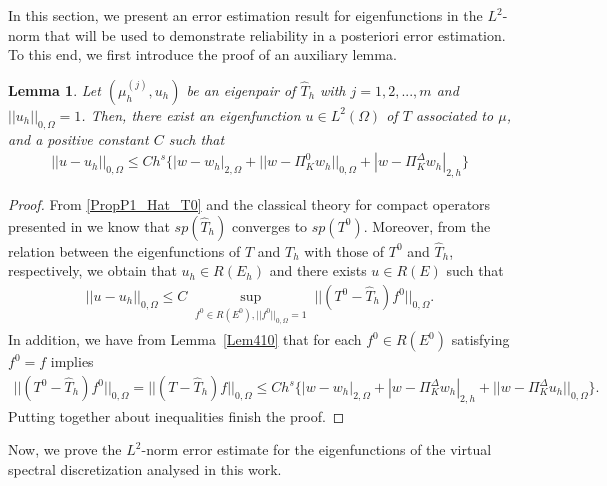 \documentclass[final,reqno]{elsarticle}
\newtheorem{lemma}{Lemma}[section]
\def\LO{L^2(\O)}
\def\O{\Omega}
\def\PiK{\Pi_{K}^{\Delta}}
\def\LO{L^2(\Omega)}
\begin{document}
In this section, we present an error estimation result for eigenfunctions in the $L^2$-norm that will be used to demonstrate reliability in a posteriori error estimation. To this end, we first introduce the proof of an auxiliary lemma.
\begin{lemma}\label{Lema4.12} Let $(\mu_h^{(j)},u_h)$ be an eigenpair of $\widehat{T}_h$  with $j=1,2,...,m$ and $||u_h ||_{0,\O}=1$. Then, there exist an eigenfunction $u\in \LO$ of $T$ associated to $\mu$, and a positive constant $C$ such that
\begin{align}
||u-u_h ||_{0,\O}\leq  Ch^s\Big\{|w-w_h|_{2,\O}+||w-\Pi_K^0 w_h ||_{0,\Omega}+|w-\PiK  w_h|_{2,h}\Big\} \label{aux_pre_th}
\end{align}  
\end{lemma}
\begin{proof}
From \eqref{PropP1_Hat_T0} and the classical theory for compact operators presented in \cite{BO} we know that $sp(\widehat{T}_h)$ converges to $sp(T^0)$. Moreover, from the relation between the eigenfunctions of $T$ and $T_h$ with those of $T^0$ and $\widehat{T}_h$, respectively, we obtain that $u_h\in R(E_h)$ and there exists $u\in R(E)$ such that \begin{align*}
||u-u_h ||_{0,\O}\leq C \sup\limits_{\substack{f^0\in R(E^0),||f^0 ||_{0,\O}=1}}||(T^0-\widehat{T}_h)f^0 ||_{0,\O}.
\end{align*} 
In addition, we have from Lemma~\ref{Lem410} that for each $f^0\in R(E^0)$ satisfying $f^0=f$ implies
\begin{align*}
||(T^0-\widehat{T}_h)f^0 ||_{0,\O}=||(T-\widehat{T}_h)f ||_{0,\O}\leq C h^s\Big\{|w-w_h|_{2,\Omega}+|w-\PiK w_h|_{2,h} +||w-\PiK u_h ||_{0,\Omega} \Big\}.
\end{align*}
Putting together about inequalities finish the proof.
\end{proof}



Now, we prove the $L^2$-norm error estimate for the eigenfunctions of the virtual spectral discretization analysed in this work.
\end{document}
